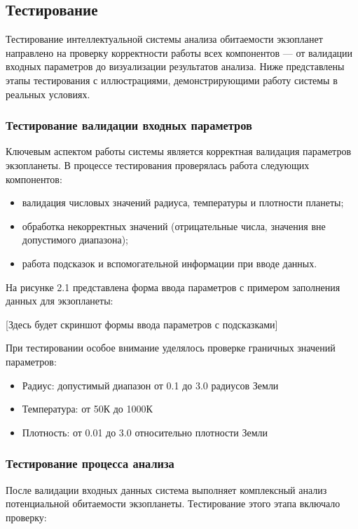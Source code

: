 \newpage
\subsection{Тестирование}

Тестирование интеллектуальной системы анализа обитаемости экзопланет направлено на проверку корректности работы всех компонентов — от валидации входных параметров до визуализации результатов анализа. Ниже представлены этапы тестирования с иллюстрациями, демонстрирующими работу системы в реальных условиях.

\subsubsection{Тестирование валидации входных параметров}

Ключевым аспектом работы системы является корректная валидация параметров экзопланеты. В процессе тестирования проверялась работа следующих компонентов:

\begin{itemize}
    \item валидация числовых значений радиуса, температуры и плотности планеты;
    \item обработка некорректных значений (отрицательные числа, значения вне допустимого диапазона);
    \item работа подсказок и вспомогательной информации при вводе данных.
\end{itemize}

На рисунке 2.1 представлена форма ввода параметров с примером заполнения данных для экзопланеты:

[Здесь будет скриншот формы ввода параметров с подсказками]

При тестировании особое внимание уделялось проверке граничных значений параметров:
\begin{itemize}
    \item Радиус: допустимый диапазон от 0.1 до 3.0 радиусов Земли
    \item Температура: от 50К до 1000К
    \item Плотность: от 0.01 до 3.0 относительно плотности Земли
\end{itemize}

\subsubsection{Тестирование процесса анализа}

После валидации входных данных система выполняет комплексный анализ потенциальной обитаемости экзопланеты. Тестирование этого этапа включало проверку:

